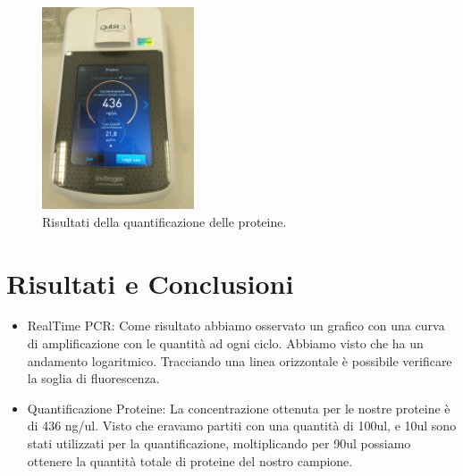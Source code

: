 \begin{figure}[H]

	\centering
	\includegraphics[width=0.4\textwidth]{./immagini/qubit3.jpg}
	\caption{Risultati della quantificazione delle proteine.}
	\label{fig:qubit3}

\end{figure}

\section{Risultati e Conclusioni}

\begin{itemize}
\item RealTime PCR:
Come risultato abbiamo osservato un grafico con una curva di amplificazione
con le quantit\`a ad ogni ciclo.
Abbiamo visto che ha un andamento logaritmico.
Tracciando una linea orizzontale \`e possibile verificare la soglia di fluorescenza.\\

\item Quantificazione Proteine:
La concentrazione ottenuta per le nostre proteine \`e di 436 ng/ul. Visto che eravamo partiti con una
quantit\`a di 100ul, e 10ul sono stati utilizzati per la quantificazione, moltiplicando per 90ul possiamo
ottenere la quantit\`a totale di proteine del nostro campione.
\end{itemize}
